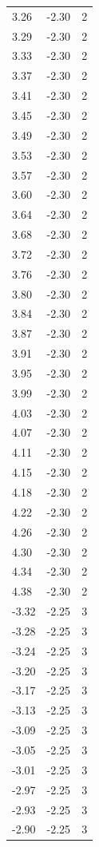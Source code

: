 \begin{longtable}{lrr}
  3.26 & -2.30 & 2 \\
  3.29 & -2.30 & 2 \\
  3.33 & -2.30 & 2 \\
  3.37 & -2.30 & 2 \\
  3.41 & -2.30 & 2 \\
  3.45 & -2.30 & 2 \\
  3.49 & -2.30 & 2 \\
  3.53 & -2.30 & 2 \\
  3.57 & -2.30 & 2 \\
  3.60 & -2.30 & 2 \\
  3.64 & -2.30 & 2 \\
  3.68 & -2.30 & 2 \\
  3.72 & -2.30 & 2 \\
  3.76 & -2.30 & 2 \\
  3.80 & -2.30 & 2 \\
  3.84 & -2.30 & 2 \\
  3.87 & -2.30 & 2 \\
  3.91 & -2.30 & 2 \\
  3.95 & -2.30 & 2 \\
  3.99 & -2.30 & 2 \\
  4.03 & -2.30 & 2 \\
  4.07 & -2.30 & 2 \\
  4.11 & -2.30 & 2 \\
  4.15 & -2.30 & 2 \\
  4.18 & -2.30 & 2 \\
  4.22 & -2.30 & 2 \\
  4.26 & -2.30 & 2 \\
  4.30 & -2.30 & 2 \\
  4.34 & -2.30 & 2 \\
  4.38 & -2.30 & 2 \\
  -3.32 & -2.25 & 3 \\
  -3.28 & -2.25 & 3 \\
  -3.24 & -2.25 & 3 \\
  -3.20 & -2.25 & 3 \\
  -3.17 & -2.25 & 3 \\
  -3.13 & -2.25 & 3 \\
  -3.09 & -2.25 & 3 \\
  -3.05 & -2.25 & 3 \\
  -3.01 & -2.25 & 3 \\
  -2.97 & -2.25 & 3 \\
  -2.93 & -2.25 & 3 \\
  -2.90 & -2.25 & 3 \\

\end{longtable}

